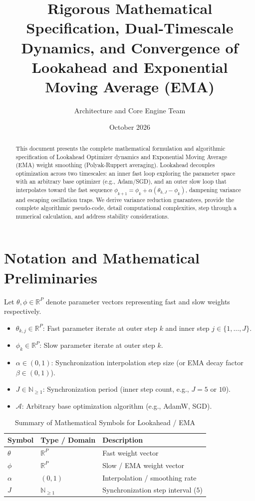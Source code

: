 \documentclass[11pt,a4paper]{article}
\title{\textbf{Rigorous Mathematical Specification, Dual-Timescale Dynamics, and Convergence of Lookahead and Exponential Moving Average (EMA)}}
\author{Architecture and Core Engine Team}
\date{October 2026}
\theoremstyle{definition}
\begin{document}
\maketitle

\begin{abstract}
This document presents the complete mathematical formulation and algorithmic specification of Lookahead Optimizer dynamics and Exponential Moving Average (EMA) weight smoothing (Polyak-Ruppert averaging). Lookahead decouples optimization across two timescales: an inner fast loop exploring the parameter space with an arbitrary base optimizer (e.g., Adam/SGD), and an outer slow loop that interpolates toward the fast sequence $\phi_{k+1} = \phi_k + \alpha (\theta_{k, J} - \phi_k)$, dampening variance and escaping oscillation traps. We derive variance reduction guarantees, provide the complete algorithmic pseudo-code, detail computational complexities, step through a numerical calculation, and address stability considerations.
\end{abstract}

\section{Notation and Mathematical Preliminaries}

Let $\theta, \phi \in \mathbb{R}^P$ denote parameter vectors representing fast and slow weights respectively.

\begin{itemize}
    \item $\theta_{k, j} \in \mathbb{R}^P$: Fast parameter iterate at outer step $k$ and inner step $j \in \{1, \dots, J\}$.
    \item $\phi_k \in \mathbb{R}^P$: Slow parameter iterate at outer step $k$.
    \item $\alpha \in (0, 1)$: Synchronization interpolation step size (or EMA decay factor $\beta \in (0, 1)$).
    \item $J \in \mathbb{N}_{\ge 1}$: Synchronization period (inner step count, e.g., $J = 5$ or $10$).
    \item $\mathcal{A}$: Arbitrary base optimization algorithm (e.g., AdamW, SGD).
\end{itemize}

\begin{table}[h]
\centering
\caption{Summary of Mathematical Symbols for Lookahead / EMA}
\begin{tabular}{lll}
\toprule
\textbf{Symbol} & \textbf{Type / Domain} & \textbf{Description} \\
\midrule
$\theta$ & $\mathbb{R}^P$ & Fast weight vector \\
$\phi$ & $\mathbb{R}^P$ & Slow / EMA weight vector \\
$\alpha$ & $(0, 1)$ & Interpolation / smoothing rate \\
$J$ & $\mathbb{N}_{\ge 1}$ & Synchronization step interval ($5$) \\
\bottomrule
\end{tabular}
\end{table}
\end{document}
